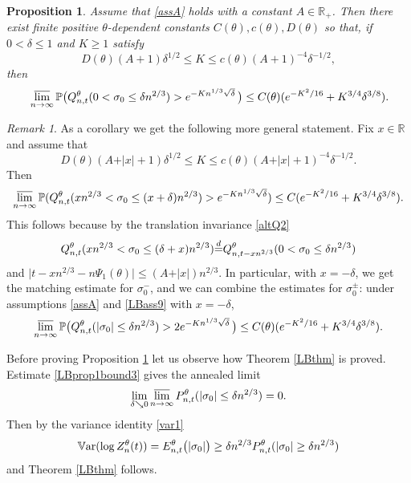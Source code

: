 \documentclass[11pt]{amsart}
\newtheorem{proposition}[theorem]{\sc Proposition}
\numberwithin{equation}{section}
\theoremstyle{remark}
\newtheorem{remark}[theorem]{Remark}
\providecommand{\abs}[1]{\vert#1\vert}
\begin{document}
\begin{proposition} Assume that  \eqref{assA} holds with a constant
$A\in{\mathbb{R}}_+$.
  Then there exist
finite positive ${\theta}$-dependent 
constants $C({\theta}), c({\theta}), D({\theta}) $ so that,  if  $0<\delta\le 1$ and $K\ge 1$ 
satisfy \[  D({\theta})(A+1)\delta^{1/2}\le K\le c({\theta})(A+1)^{-4}\delta^{-1/2}, \] 
then 
\begin{equation} {\nonumber}   \varlimsup_{n\to \infty} {\mathbb{P}}\bigl(Q^{\theta}_{n,t}(0< \sigma_0\le \delta n^{2/3})>e^{-K n^{1/3} \sqrt{\delta}}\,\bigr)\le C({\theta})(e^{-K^2/16}+ K^{3/4} \delta ^{3/8}).
\end{equation}
\label{LBprop1}\end{proposition}
\begin{remark}
As a corollary we   get the following more general statement. Fix $x\in{\mathbb{R}}$ and assume
that 
 \begin{equation}  D({\theta})(A+\abs{x}+1)\delta^{1/2}\le K\le c({\theta})(A+\abs{x}+1)^{-4}\delta^{-1/2}. 
 \label{LBass9}\end{equation}
Then
\begin{equation}  \varlimsup_{n\to \infty} {\mathbb{P}}(Q^{\theta}_{n,t}(x n^{2/3}< \sigma_0\le (x+\delta) n^{2/3})>e^{-K n^{1/3} \sqrt{\delta}})\le C(e^{-K^2/16}+ K^{3/4} \delta ^{3/8}).
\end{equation}
This follows because by the translation invariance   \eqref{altQ2}
\begin{equation}{\nonumber} 
Q^{\theta}_{n,t}(x n^{2/3}< \sigma_0\le (\delta+x) n^{2/3}){\stackrel{d}{=}} Q^{\theta}_{n,t-x n^{2/3}}(0< \sigma_0\le \delta n^{2/3})
\end{equation} 
and  $\abs{t-xn^{2/3}-n {\Psi_1}({\theta})}\le (A+\abs{x}) n^{2/3}$.
In particular, with $x=-\delta$, we get the  matching estimate for $\sigma_0^-$, and we can
combine the estimates for $\sigma^\pm_0$:  under assumptions \eqref{assA} and \eqref{LBass9} with $x=-\delta$,
\begin{equation}    \varlimsup_{n\to \infty} {\mathbb{P}}\bigl(Q^{\theta}_{n,t}(\abs{\sigma_0}\le \delta n^{2/3})>2e^{-K n^{1/3} \sqrt{\delta}}\,\bigr)\le C({\theta})(e^{-K^2/16}+ K^{3/4} \delta ^{3/8}).
\label{LBprop1bound3}\end{equation}
\end{remark}

Before proving 
  Proposition \ref{LBprop1}  let us observe how   Theorem \ref{LBthm} is proved.
Estimate \eqref{LBprop1bound3} gives the annealed limit 
\[
 \lim_{\delta \searrow 0} \varlimsup_{n\to \infty} P^{\theta}_{n,t}(\abs{\sigma_0}\le \delta n^{2/3})=0.
\]
Then by the  variance identity  \eqref{var1}  
\[
{{\rm\mathbb{V}ar}}(\log Z_n^{\theta}(t))
=E_{n,t}^{\theta}\bigl(\abs{\sigma_0}\bigr) \ge \delta n^{2/3} P^{\theta}_{n,t}(\abs{\sigma_0}\ge \delta n^{2/3}) \]
and  Theorem \ref{LBthm} follows.  
\end{document}
